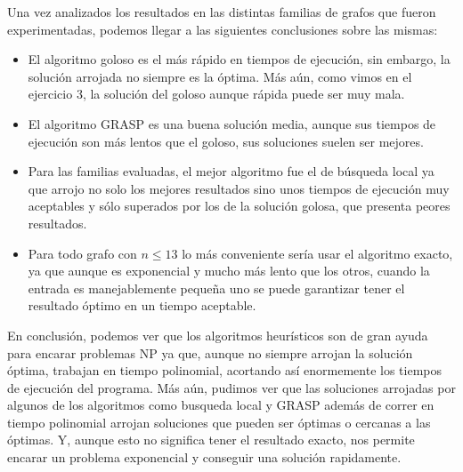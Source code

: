 Una vez analizados los resultados en las distintas familias de grafos que fueron experimentadas, podemos llegar a las siguientes conclusiones sobre las mismas:

\begin{itemize}

\item El algoritmo goloso es el más rápido en tiempos de ejecución, sin embargo, la solución arrojada no siempre es la óptima. Más aún, como vimos en el ejercicio 3, la solución del goloso aunque rápida puede ser muy mala.

\item El algoritmo GRASP es una buena solución media, aunque sus tiempos de ejecución son más lentos que el goloso, sus soluciones suelen ser mejores.

\item Para las familias evaluadas, el mejor algoritmo fue el de búsqueda local ya que arrojo no solo los mejores resultados sino unos tiempos de ejecución muy aceptables y sólo superados por los de la solución golosa, que presenta peores resultados.

\item Para todo grafo con $n \leq 13$ lo más conveniente sería usar el algoritmo exacto, ya que aunque es exponencial y mucho más lento que los otros, cuando la entrada es manejablemente pequeña uno se puede garantizar tener el resultado óptimo en un tiempo aceptable.

\end{itemize}

En conclusión, podemos ver que los algoritmos heurísticos son de gran ayuda para encarar problemas NP ya que, aunque no siempre arrojan la solución óptima, trabajan en tiempo polinomial, acortando así enormemente los tiempos de ejecución del programa. Más aún, pudimos ver que las soluciones arrojadas por algunos de los algoritmos como busqueda local y GRASP además de correr en tiempo polinomial arrojan soluciones que pueden ser óptimas o cercanas a las óptimas. Y, aunque esto no significa tener el resultado exacto, nos permite encarar un problema exponencial y conseguir una solución rapidamente.